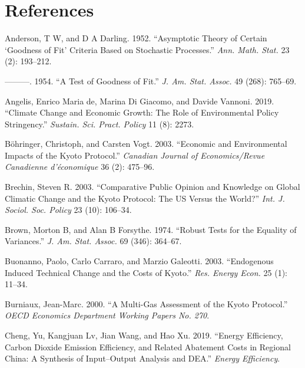 \documentclass[
  10pt,
]{article}
\begin{document}
\newpage

\hypertarget{references}{%
\section*{References}\label{references}}

\hypertarget{refs}{}
\leavevmode\hypertarget{ref-Anderson1952}{}%
Anderson, T W, and D A Darling. 1952. ``Asymptotic Theory of Certain
`Goodness of Fit' Criteria Based on Stochastic Processes.'' \emph{Ann.
Math. Stat.} 23 (2): 193--212.

\leavevmode\hypertarget{ref-Anderson1954}{}%
---------. 1954. ``A Test of Goodness of Fit.'' \emph{J. Am. Stat.
Assoc.} 49 (268): 765--69.

\leavevmode\hypertarget{ref-De_Angelis2019}{}%
Angelis, Enrico Maria de, Marina Di Giacomo, and Davide Vannoni. 2019.
``Climate Change and Economic Growth: The Role of Environmental Policy
Stringency.'' \emph{Sustain. Sci. Pract. Policy} 11 (8): 2273.

\leavevmode\hypertarget{ref-Bohringer2003}{}%
Böhringer, Christoph, and Carsten Vogt. 2003. ``Economic and
Environmental Impacts of the Kyoto Protocol.'' \emph{Canadian Journal of
Economics/Revue Canadienne d'économique} 36 (2): 475--96.

\leavevmode\hypertarget{ref-Brechin2003}{}%
Brechin, Steven R. 2003. ``Comparative Public Opinion and Knowledge on
Global Climatic Change and the Kyoto Protocol: The US Versus the
World?'' \emph{Int. J. Sociol. Soc. Policy} 23 (10): 106--34.

\leavevmode\hypertarget{ref-Brown1974}{}%
Brown, Morton B, and Alan B Forsythe. 1974. ``Robust Tests for the
Equality of Variances.'' \emph{J. Am. Stat. Assoc.} 69 (346): 364--67.

\leavevmode\hypertarget{ref-Buonanno2003}{}%
Buonanno, Paolo, Carlo Carraro, and Marzio Galeotti. 2003. ``Endogenous
Induced Technical Change and the Costs of Kyoto.'' \emph{Res. Energy
Econ.} 25 (1): 11--34.

\leavevmode\hypertarget{ref-Burniaux2000}{}%
Burniaux, Jean-Marc. 2000. ``A Multi-Gas Assessment of the Kyoto
Protocol.'' \emph{OECD Economics Department Working Papers No. 270}.

\leavevmode\hypertarget{ref-Cheng2019}{}%
Cheng, Yu, Kangjuan Lv, Jian Wang, and Hao Xu. 2019. ``Energy
Efficiency, Carbon Dioxide Emission Efficiency, and Related Abatement
Costs in Regional China: A Synthesis of Input--Output Analysis and
DEA.'' \emph{Energy Efficiency}.
\end{document}
